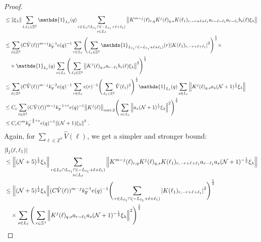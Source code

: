 \documentclass[12pt,a4paper]{article}
\numberwithin{equation}{section}
\newcommand{\1}{\mathbb{I}}
\newcommand{\F}{\mathrm{F}}
\newcommand{\I}{\mathrm{I}}
\newcommand{\Zstar}{\mathbb{Z}^3} %
\newcommand{\Z}{\mathbb{Z}}
\newcommand{\NN}{\mathcal{N}}
\newcommand{\half}{\frac{1}{2}}
\theoremstyle{plain}
\theoremstyle{definition}
\theoremstyle{remark}
\theoremstyle{plain}
\theoremstyle{definition}
\theoremstyle{remark}
\begin{document}
\begin{proof}
\begin{align}
	&\leq \norm{ \xi_\lambda} \sum_{\ell,\ell_1 \in \Zstar} \mathds{1}_{L_\ell}(q)
		\sum\limits_{\substack{r\in L_{\ell} \cap L_{\ell_1}  \cap (-L_{\ell_1} + \ell + \ell_1)\\s\in L_{\ell}}}
		\norm{K^{m-j}(\ell)_{r,q} K^j(\ell)_{q,s} K(\ell_1)_{r,-r+\ell+\ell_1} a_{r-\ell-\ell_1} a_{r-\ell_1} b_{s}(\ell) \xi_\lambda }\nonumber\\
	&\leq \sum_{\ell \in \Zstar}
		(C \hat{V}(\ell))^{m-j} k_{\F}^{-1} e(q)^{-1}
		\sum\limits_{r \in L_\ell} \Bigg(\sum_{\ell_1 \in \Zstar} \mathds{1}_{L_{\ell_1} \cap (-L_{\ell_1}+\ell+\ell_1)}(r) \abs{ K(\ell_1)_{r,-r+\ell+\ell_1} }^2\Bigg)^\half \times\nonumber\\ 
	&\quad \times \mathds{1}_{L_\ell}(q) \sum\limits_{s\in L_{\ell}} \Bigg( \sum_{\ell_1 \in \Z^3} \norm{K^{j}(\ell)_{q,s} a_{r-\ell_1} b_{s}(\ell) \xi_\lambda }^2 \Bigg)^\half \nonumber\\
	&\leq \sum_{\ell \in \Zstar}
		(C \hat{V}(\ell))^{m-j} k_{\F}^{-2} e(q)^{-1}
		\sum\limits_{r \in L_\ell} e(r)^{-1} \Bigg(\sum_{\ell_1 \in \Zstar} \hat{V}(\ell_1)^2 \Bigg)^\half
		\mathds{1}_{L_\ell}(q) \sum\limits_{s\in L_{\ell}} \norm{K^{j}(\ell)_{q,s} a_s (\NN+1)^{\half} \xi_\lambda } \nonumber\\
	&\leq C_\varepsilon \sum_{\ell \in \Zstar}
		(C \hat{V}(\ell))^{m-j} k_{\F}^{-1+\varepsilon} e(q)^{-1}
		\norm{K^j(\ell)}_{\max,2}
		\Bigg( \sum\limits_{s\in L_{\ell}} \norm{a_s (\NN+1)^{\half} \xi_\lambda }^2 \Bigg)^{\half} \nonumber\\
	&\leq C_\varepsilon C^m k_{\F}^{-\frac 32 + \varepsilon} e(q)^{-1} \norm{(\NN+1) \xi_\lambda }^2 \;. \label{eq:estEQ1122_Coulomb}
\end{align}
Again, for $ \sum_{\ell \in \Zstar} \hat{V}(\ell) $, we get a simpler and stronger bound:
\begin{align}
	&|\I_j(\ell, \ell_1)| \nonumber\\
	&\leq \norm{ (\NN+5)^{\half} \xi_\lambda}
		\sum_{\substack{r\in L_{\ell} \cap L_{\ell_1} \cap (-L_{\ell_1} + \ell + \ell_1)\\s\in L_{\ell}}}
		\norm{K^{m-j}(\ell)_{r,q} K^j(\ell)_{q,s} K(\ell_1)_{r,-r+\ell+\ell_1} a_{r-\ell_1} a_s (\NN+1)^{-\half} \xi_\lambda }\nonumber\\
	&\leq \norm{ (\NN+5)^{\half} \xi_\lambda} 
		(C \hat{V}(\ell))^{m-j} k_{\F}^{-1} e(q)^{-1}
		\Bigg(\sum_{r\in L_{\ell_1} \cap (-L_{\ell_1} + \ell + \ell_1)}\abs{ K(\ell_1)_{r,-r+\ell+\ell_1} }^2\Bigg)^\half \nonumber\\
	&\quad \times \sum_{s\in L_{\ell}} \Bigg( \sum_{r \in \Z^3}\norm{K^{j}(\ell)_{q,s} a_{r-\ell_1} a_s (\NN+1)^{-\half} \xi_\lambda }^2 \Bigg)^\half \nonumber\\

\end{align}
\end{proof}
\end{document}
